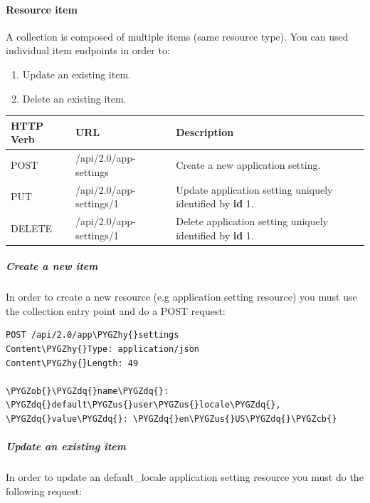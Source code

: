\documentclass[letterpaper,10pt,english]{sphinxmanual}
\def\PYGZus{\char`\_}
\def\PYGZob{\char`\{}
\def\PYGZcb{\char`\}}
\def\PYGZhy{\char`\-}
\def\PYGZdq{\char`\"}
\begin{document}
\paragraph{Resource item}
\label{features/roa/rest_standard:resource-item}
A collection is composed of multiple items (same resource type). You can used individual item endpoints in order to:
\begin{enumerate}
\item {} 
Update an existing item.

\item {} 
Delete an existing item.

\end{enumerate}

\begin{tabulary}{\linewidth}{|L|L|L|}
\hline

\textbf{HTTP Verb}
 & 
\textbf{URL}
 & 
\textbf{Description}
\\\hline

POST
 & 
/api/2.0/app-settings
 & 
Create a new application setting.
\\\hline

PUT
 & 
/api/2.0/app-settings/1
 & 
Update application setting uniquely identified by \textbf{id} 1.
\\\hline

DELETE
 & 
/api/2.0/app-settings/1
 & 
Delete application setting uniquely identified by \textbf{id} 1.
\\\hline
\end{tabulary}



\subparagraph{Create a new item}
\label{features/roa/rest_standard:create-a-new-item}
In order to create a new resource (e.g application setting resource) you must use the collection entry point and do a
POST request:

\begin{Verbatim}[commandchars=\\\{\}]
POST /api/2.0/app\PYGZhy{}settings
Content\PYGZhy{}Type: application/json
Content\PYGZhy{}Length: 49

\PYGZob{}\PYGZdq{}name\PYGZdq{}: \PYGZdq{}default\PYGZus{}user\PYGZus{}locale\PYGZdq{}, \PYGZdq{}value\PYGZdq{}: \PYGZdq{}en\PYGZus{}US\PYGZdq{}\PYGZcb{}
\end{Verbatim}


\subparagraph{Update an existing item}
\label{features/roa/rest_standard:update-an-existing-item}
In order to update an default\_locale application setting resource you must do the following request:
\end{document}
